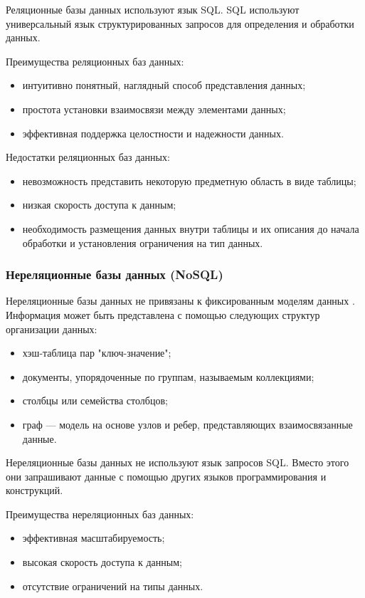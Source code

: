 Реляционные базы данных используют язык SQL. SQL используют универсальный язык структурированных запросов для определения и обработки данных.

Преимущества реляционных баз данных:

\begin{itemize}
	\item интуитивно понятный, наглядный способ представления данных;
	\item простота установки взаимосвязи между элементами данных;
	\item эффективная поддержка целостности и надежности данных.
\end{itemize}

Недостатки реляционных баз данных:

\begin{itemize}
	\item невозможность представить некоторую предметную область в виде таблицы;
	\item низкая скорость доступа к данным;
	\item необходимость размещения данных внутри таблицы и их описания до начала обработки и установления ограничения на тип данных.
\end{itemize}

\subsubsection{Нереляционные базы данных (NoSQL)}

Нереляционные базы данных не привязаны к фиксированным моделям данных \cite{nosql}. Информация может быть представлена с помощью следующих структур организации данных:

\begin{itemize}
	\item хэш-таблица пар "ключ-значение";
	\item документы, упорядоченные по группам, называемым коллекциями;
	\item столбцы или семейства столбцов;
	\item граф --- модель на основе узлов и ребер, представляющих взаимосвязанные данные.
\end{itemize}

Нереляционные базы данных не используют язык запросов SQL. Вместо этого они запрашивают данные с помощью других языков программирования и конструкций.

Преимущества нереляционных баз данных:

\begin{itemize}
	\item эффективная масштабируемость;
	\item высокая скорость доступа к данным;
	\item отсутствие ограничений на типы данных.
\end{itemize}


